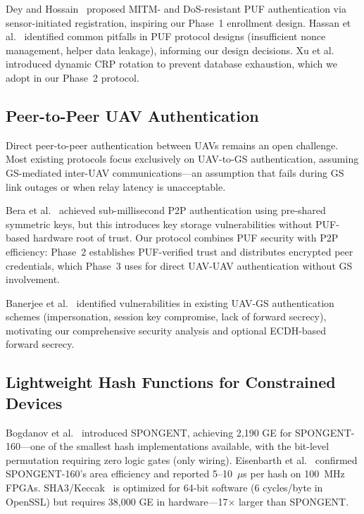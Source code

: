 \documentclass[11pt,a4paper]{article}
\begin{document}
Dey and Hossain~\cite{puf_mitm_dos} proposed MITM- and DoS-resistant PUF authentication via sensor-initiated registration, inspiring our Phase~1 enrollment design. Hassan et al.~\cite{puf_secure_design} identified common pitfalls in PUF protocol designs (insufficient nonce management, helper data leakage), informing our design decisions. Xu et al.~\cite{arbiter_puf_iot} introduced dynamic CRP rotation to prevent database exhaustion, which we adopt in our Phase~2 protocol.

\subsection{Peer-to-Peer UAV Authentication}

Direct peer-to-peer authentication between UAVs remains an open challenge. Most existing protocols focus exclusively on UAV-to-GS authentication, assuming GS-mediated inter-UAV communications---an assumption that fails during GS link outages or when relay latency is unacceptable.

Bera et al.~\cite{peer2peer_auth} achieved sub-millisecond P2P authentication using pre-shared symmetric keys, but this introduces key storage vulnerabilities without PUF-based hardware root of trust. Our protocol combines PUF security with P2P efficiency: Phase~2 establishes PUF-verified trust and distributes encrypted peer credentials, which Phase~3 uses for direct UAV-UAV authentication without GS involvement.

Banerjee et al.~\cite{puf_uav_security_analysis} identified vulnerabilities in existing UAV-GS authentication schemes (impersonation, session key compromise, lack of forward secrecy), motivating our comprehensive security analysis and optional ECDH-based forward secrecy.

\subsection{Lightweight Hash Functions for Constrained Devices}

Bogdanov et al.~\cite{spongent_original} introduced SPONGENT, achieving 2,190 GE for SPONGENT-160---one of the smallest hash implementations available, with the bit-level permutation requiring zero logic gates (only wiring). Eisenbarth et al.~\cite{lightweight_crypto_evaluation} confirmed SPONGENT-160's area efficiency and reported 5--10~$\mu$s per hash on 100~MHz FPGAs. SHA3/Keccak~\cite{sha3_standard} is optimized for 64-bit software (6 cycles/byte in OpenSSL) but requires 38,000 GE in hardware---17$\times$ larger than SPONGENT.
\end{document}
